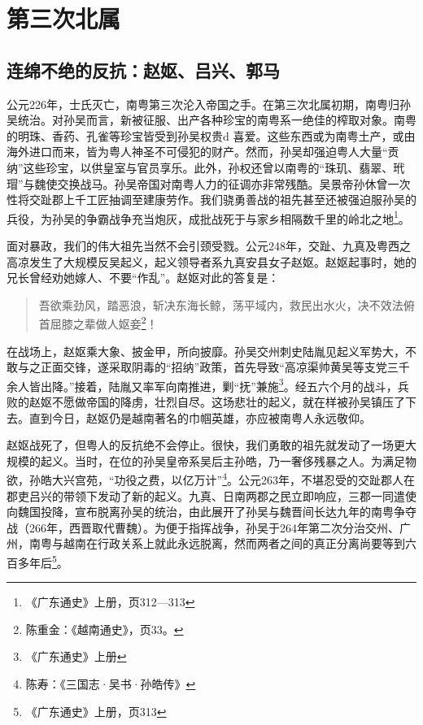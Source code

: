 \chapter{第三次北属}

\section{连绵不绝的反抗：赵妪、吕兴、郭马}

\indent 公元226年，士氏灭亡，南粤第三次沦入帝国之手。在第三次北属初期，南粤归孙吴统治。对孙吴而言，新被征服、出产各种珍宝的南粤系一绝佳的榨取对象。南粤的明珠、香药、孔雀等珍宝皆受到孙吴权贵d 喜爱。这些东西或为南粤土产，或由海外进口而来，皆为粤人神圣不可侵犯的财产。然而，孙吴却强迫粤人大量“贡纳”这些珍宝，以供皇室与官员享乐。此外，孙权还曾以南粤的“珠玑、翡翠、玳瑁”与魏使交换战马。孙吴帝国对南粤人力的征调亦非常残酷。吴景帝孙休曾一次性将交趾郡上千工匠抽调至建康劳作。我们骁勇善战的祖先甚至还被强迫服孙吴的兵役，为孙吴的争霸战争充当炮灰，成批战死于与家乡相隔数千里的岭北之地\footnote{《广东通史》上册，页312—313}。

面对暴政，我们的伟大祖先当然不会引颈受戮。公元248年，交趾、九真及粤西之高凉发生了大规模反吴起义，起义领导者系九真安县女子赵妪。赵妪起事时，她的兄长曾经劝她嫁人、不要“作乱”。赵妪对此的答复是：

\begin{quote}
	吾欲乘劲风，踏恶浪，斩决东海长鲸，荡平域内，救民出水火，决不效法俯首屈膝之辈做人妪妾\footnote{陈重金：《越南通史》，页33。}！
\end{quote}

在战场上，赵妪乘大象、披金甲，所向披靡。孙吴交州刺史陆胤见起义军势大，不敢与之正面交锋，遂采取阴毒的“招纳”政策，首先导致“高凉渠帅黄吴等支党三千余人皆出降。”接着，陆胤又率军向南推进，剿“抚”兼施\footnote{《广东通史》上册}。经五六个月的战斗，兵败的赵妪不愿做帝国的降虏，壮烈自尽。这场悲壮的起义，就在样被孙吴镇压了下去。直到今日，赵妪仍是越南著名的巾帼英雄，亦应被南粤人永远敬仰。

赵妪战死了，但粤人的反抗绝不会停止。很快，我们勇敢的祖先就发动了一场更大规模的起义。当时，在位的孙吴皇帝系吴后主孙皓，乃一奢侈残暴之人。为满足物欲，孙皓大兴宫苑，“功役之费，以亿万计”\footnote{陈寿：《三国志·吴书·孙皓传》}。公元263年，不堪忍受的交趾郡人在郡吏吕兴的带领下发动了新的起义。九真、日南两郡之民立即响应，三郡一同遣使向魏国投降，宣布脱离孙吴的统治，由此展开了孙吴与魏晋间长达九年的南粤争夺战（266年，西晋取代曹魏）。为便于指挥战争，孙吴于264年第二次分治交州、广州，南粤与越南在行政关系上就此永远脱离，然而两者之间的真正分离尚要等到六百多年后\footnote{《广东通史》上册，页313}。

